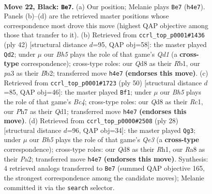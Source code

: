 \documentclass[11pt]{article}
\begin{document}
\clearpage

\begin{figure}[p]\centering
\begin{subfigure}{0.46\textwidth}\centering
\resizebox{\linewidth}{!}{%
\newchessgame
\chessboard[
  setfen={rn1qr1k1/pp1b1ppp/8/2PpP3/6Pb/P1N3P1/1P1B1P2/1BRQR1K1 b - - 0 22},
  showmover=false,
  pgfstyle=straightmove, color=movearrow, markmove={h4-e7}
]}
\caption{}
\end{subfigure}\hfill
\begin{subfigure}{0.46\textwidth}\centering
\resizebox{\linewidth}{!}{%
\newchessgame
\chessboard[
  setfen={r2qr1k1/1pp2pb1/3p1np1/7p/bPPNP3/6PP/1B3PB1/1R1QR1K1 w - - 0 22},
  showmover=false,
  pgfstyle=straightmove, color=movearrow, markmove={d1-d2}
]}
\caption{}
\end{subfigure}
\\[4pt]
\begin{subfigure}{0.46\textwidth}\centering
\resizebox{\linewidth}{!}{%
\newchessgame
\chessboard[
  setfen={1r1r2k1/3qb1pp/p3pp2/3b4/PnBP4/N5R1/1P1B1PPP/2RQ2K1 w - - 5 26},
  showmover=false,
  pgfstyle=straightmove, color=movearrow, markmove={c4-f1}
]}
\caption{}
\end{subfigure}\hfill
\begin{subfigure}{0.46\textwidth}\centering
\resizebox{\linewidth}{!}{%
\newchessgame
\chessboard[
  setfen={r1bq1rk1/3nbpp1/p1p4p/3p4/5B1P/2N1Q3/PPP1BPP1/2KR3R w - - 0 15},
  showmover=false,
  pgfstyle=straightmove, color=movearrow, markmove={e3-g3}
]}
\caption{}
\end{subfigure}
\caption{\textbf{Move 22, Black: \texttt{Be7}.} (a) Our position; Melanie plays \texttt{Be7} (\texttt{h4e7}). Panels (b)--(d) are the retrieved master positions whose correspondence most drove this move (highest QAP objective among those that transfer to it). (b) Retrieved from \texttt{ccrl\_top\_p0001\#1436} (ply 42) [structural distance $d$=95, QAP obj=58]: the master played \texttt{Qd2}; under $\mu$ our \emph{Bh5} plays the role of that game's \emph{Qd1} (a \textbf{cross-type} correspondence); cross-type roles: our \emph{Q}d8 as their \emph{R}b1, our \emph{p}a3 as their \emph{B}b2; transferred move \texttt{h4e7} \textbf{(endorses this move)}. (c) Retrieved from \texttt{ccrl\_top\_p0001\#1723} (ply 50) [structural distance $d$=85, QAP obj=46]: the master played \texttt{Bf1}; under $\mu$ our \emph{Bh5} plays the role of that game's \emph{Bc4}; cross-type roles: our \emph{Q}d8 as their \emph{R}c1, our \emph{P}h7 as their \emph{Q}d1; transferred move \texttt{h4e7} \textbf{(endorses this move)}. (d) Retrieved from \texttt{ccrl\_top\_p0000\#2508} (ply 28) [structural distance $d$=96, QAP obj=34]: the master played \texttt{Qg3}; under $\mu$ our \emph{Bh5} plays the role of that game's \emph{Qe3} (a \textbf{cross-type} correspondence); cross-type roles: our \emph{Q}d8 as their \emph{R}h1, our \emph{R}a8 as their \emph{P}a2; transferred move \texttt{h4e7} \textbf{(endorses this move)}. Synthesis: 4 retrieved analogs transferred to \texttt{Be7} (summed QAP objective 165, the strongest correspondence among the candidate moves); Melanie committed it via the \texttt{search} selector.}
\label{fig:thought-m43}
\end{figure}
\end{document}
